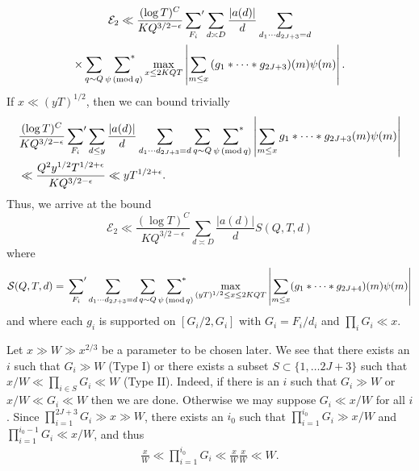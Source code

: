 \documentclass[oneside, 12pt]{amsart}
\theoremstyle{definition}
\renewcommand{\pmod}[1]{\,(\textup{mod}\,#1)}
\newcommand{\leqs}{\leqslant }
\begin{document}
\begin{multline*}
\mathcal{E}_2
 \ll \frac{(\log T)^C}{KQ^{3/2-\epsilon}} \sideset{}{'}\sum_{F_i}\sum_{d\asymp D} \frac{|a(d)|}{d}\sum_{d_1 \cdots d_{2J+3}=d}
\\\times
\sum_{q\sim Q} \sideset{}{^*}\sum_{\,\,\psi \pmod q}
\max_{x\leq 2KQT}\left |\sum_{m\leq x} {(g_1* \cdots * g_{2J+3})(m)\psi(m)} \right|.
\end{multline*}
If $x\ll (yT)^{1/2}$, then we can bound trivially
\begin{align}
&\frac{(\log T)^C}{KQ^{3/2-\epsilon}}\sideset{}{'}\sum_{F_i}\sum_{d\leq y}\frac{|a(d)|}{d}\sum_{d_1 \cdots d_{2J+3}=d} \sum_{q\sim Q} \sideset{}{^*}\sum_{\,\,\psi \pmod q} \left| \sum_{m\leq x} {g_1* \cdots * g_{2J+3}(m)\psi(m)}\right|\nonumber\\
& \ll \frac{Q^2 y^{1/2}T^{1/2+\epsilon}}{KQ^{3/2-\epsilon}}\ll yT^{1/2+\epsilon}.\label{small x}
\end{align}
Thus, we arrive at the bound
\begin{equation}
\label{E_2 bound}
\mathcal{E}_2
 \ll \frac{(\log T)^C}{KQ^{3/2-\epsilon}} \sum_{d\asymp D} \frac{|a(d)|}{d}S(Q,T,d)
\end{equation}
where
 \begin{align}\label{ConvolutionSum}
\mathcal{S}(Q, T, d) =\sideset{}{'}\sum_{F_i}\sum_{d_1 \cdots d_{2J+3}=d}\sum_{q\sim Q}\sideset{}{^*}\sum_{\,\,\psi \pmod q}\max_{(yT)^{1/2}\leq x\leq 2KQT}\left|\sum_{ m\leq x}(g_1*\cdots *g_{2J+4})(m)\psi(m)\right|
 \end{align}
 and where each $g_i$ is supported on $[G_i/2, G_i]$ with $G_i=F_i/d_i$ and $\prod_{i}G_i\ll x$. 
 
 Let $x\gg W\gg x^{2/3}$ be a parameter to be chosen later.
  We see that there exists an $i$ such that $G_i\gg W$ (Type I) or there exists a subset $S\subset\{1,\dots 2J+3\}$ such that $x/W\ll \prod_{i\in S} G_i\ll W$ (Type II). Indeed, if there is an $i$ such that $G_i \gg W$ or $x/W\ll G_i \ll W$ then we are done. Otherwise we may suppose $G_i \ll x/W$ for all $i$. Since $\prod_{i=1}^{2J+3}G_i\gg x\gg W$, there exists an $i_0$ such that $\prod_{i=1}^{i_0}G_i\gg x/W$ and $\prod_{i=1}^{i_0-1}G_i\ll x/W$, and thus  
  \begin{align*}
  \frac{x}{W}\ll \prod_{i=1}^{i_0}G_i\ll \frac{x}{W}\frac{x}{W}\ll W.
  \end{align*}
\end{document}
